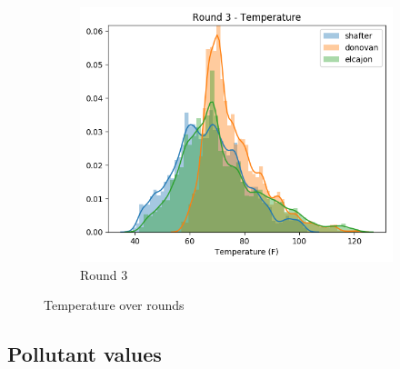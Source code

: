 \documentclass[journal abbreviation, manuscript]{copernicus}
\begin{document}
\begin{figure}[H]
\begin{subfigure}{0.32\textwidth}
\includegraphics[width=\textwidth]{results/distributions/round3_temperature.png}
\caption{Round 3}
\end{subfigure}
\caption{Temperature over rounds}
\label{fig:temperature-rounds}
\end{figure}

\subsection{Pollutant values}
\end{document}
